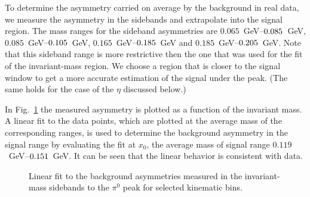 To determine the asymmetry carried on average by the background in real data, we measure the asymmetry in the sidebands and extrapolate into the signal region.
The mass ranges for the sideband asymmetries are $0.065$~GeV$\textup{--}0.085$~GeV, $0.085$~GeV$\textup{--}0.105$~GeV, $0.165$~GeV$\textup{--}0.185$~GeV and $0.185$~GeV$\textup{--}0.205$~GeV. Note that this sideband range is more restrictive then the one that was used for the fit of the invariant-mass region. We choose a region that is closer to the signal window to get a more accurate estimation of the signal under the peak. (The same holds for the case of the $\eta$ discussed below.)


In Fig.~\ref{fig:bkgasy}  the measured asymmetry is plotted as a function of the invariant mass. A linear fit to the data points, which are plotted at the average mass of the corresponding ranges, is used to determine the background asymmetry in the signal range by evaluating the fit at $x_0$, the average mass of signal range $0.119$~GeV$\textup{--}0.151$~GeV. It can be seen that the linear behavior is consistent with data.

\begin{figure}[t]
  \centering     
  \caption{Linear fit to the background asymmetries measured in the invariant-mass sidebands to the $\pi^0$ peak for
     selected kinematic bins.}
  \label{fig:bkgasy}
\end{figure}


